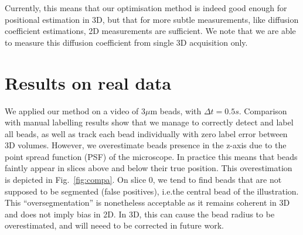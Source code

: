 \documentclass{llncs}
\begin{document}
Currently, this means that our optimisation method is indeed good enough for positional estimation in 3D, but that for more subtle measurements, like diffusion coefficient estimations, 2D measurements are sufficient. We note that we are able to measure this diffusion coefficient from single 3D acquisition only.

\section{Results on real data}
We applied our method on a video of 3$\mu$m beads, with $\Delta t=0.5s$. Comparison with manual labelling results show that we manage to correctly detect and label all beads, as well as track each bead individually with zero label error between 3D volumes. However, we overestimate beads presence in the z-axis due to the point spread function (PSF) of the microscope. In practice this means that beads faintly appear in slices above and below their true position. This overestimation is depicted in Fig.~\ref{fig:compa}. On slice 0, we tend to find beads that are not supposed to be segmented (false positives), i.e.the central bead of the illustration. This ``oversegmentation'' is nonetheless acceptable as it remains coherent in 3D and does not imply bias in 2D. In 3D, this can cause the bead radius to be overestimated, and will neeed to be corrected in future work.
\end{document}
